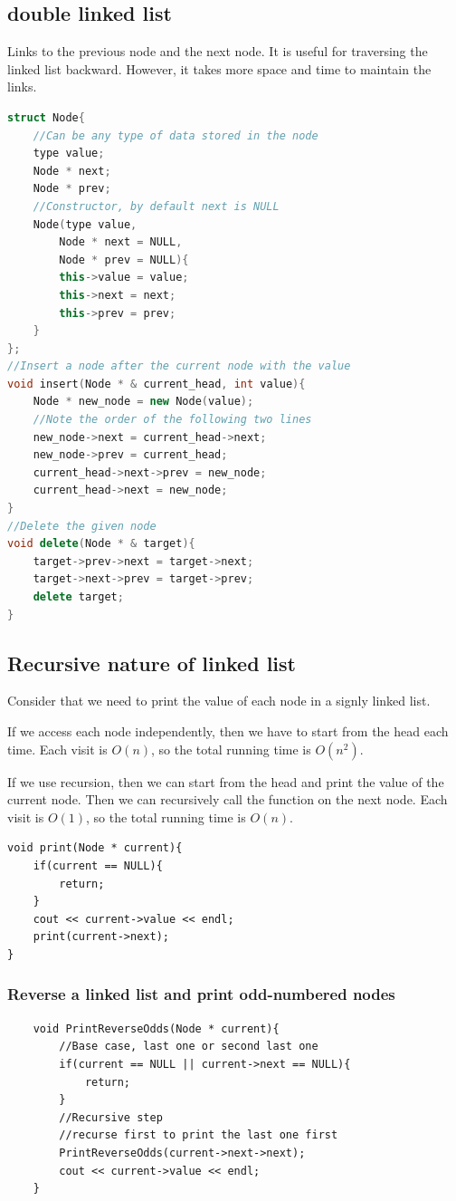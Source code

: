 \documentclass[letterpaper,12pt]{article}
\begin{document}
\subsection{double linked list}
Links to the previous node and the next node. It is useful for traversing the linked list backward. However, it takes more space and time to maintain the links.
\begin{lstlisting}[language=C++]
struct Node{
    //Can be any type of data stored in the node
    type value;
    Node * next;
    Node * prev;
    //Constructor, by default next is NULL
    Node(type value, 
        Node * next = NULL, 
        Node * prev = NULL){
        this->value = value;
        this->next = next;
        this->prev = prev;
    }
};
//Insert a node after the current node with the value
void insert(Node * & current_head, int value){
    Node * new_node = new Node(value);
    //Note the order of the following two lines
    new_node->next = current_head->next;
    new_node->prev = current_head;
    current_head->next->prev = new_node;
    current_head->next = new_node;
} 
//Delete the given node
void delete(Node * & target){
    target->prev->next = target->next;
    target->next->prev = target->prev;
    delete target;
} 
\end{lstlisting}
\subsection{Recursive nature of linked list}
Consider that we need to print the value of each node in a signly linked list.

If we access each node independently, then we have to start from the head each time. Each visit is $O(n)$, so the total running time is $O(n^2)$.

If we use recursion, then we can start from the head and print the value of the current node. Then we can recursively call the function on the next node. Each visit is $O(1)$, so the total running time is $O(n)$.
\begin{lstlisting}
void print(Node * current){
    if(current == NULL){
        return;
    }
    cout << current->value << endl;
    print(current->next);
}
\end{lstlisting}
\subsubsection{Reverse a linked list and print odd-numbered nodes}
\begin{lstlisting}
    void PrintReverseOdds(Node * current){
        //Base case, last one or second last one
        if(current == NULL || current->next == NULL){
            return;
        }
        //Recursive step
        //recurse first to print the last one first
        PrintReverseOdds(current->next->next);
        cout << current->value << endl;
    }
\end{lstlisting}
\end{document}

